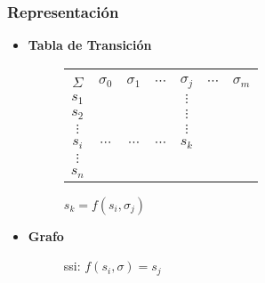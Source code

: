 \subsubsection*{Representación}
\begin{itemize}

\item \textbf{Tabla de Transición} \\

\begin{figure}[ht]
\centering
\begin{tabular}{|c|cccccc|}
    \hline
    \backslashbox{$k$}{\vspace{0.1pt}\\$\Sigma$} & $\sigma_0$ & $\sigma_1$ & $\cdots$ & $\sigma_j$ & $\cdots$ & $\sigma_m$\\ \hline
                $s_1$             &      &  &   &$\vdots$&&\\ 
                $s_2$             &      &  &  &$\vdots$&& \\ 
                $\vdots$             &      & &  & $\vdots$ &&\\ 
                $s_i$             &   $\cdots$   & $\cdots$  &$\cdots$  &$s_k$&&\\ 
                $\vdots$             &      &  &  &&& \\ 
                $s_n$             &      &  &  && &\\ \hline
\end{tabular} 
\caption{$s_k = f(s_i,\sigma_j)$}
\end{figure}
\item \textbf{Grafo} \\

\begin{figure}[ht]
\centering
{}
\caption{ssi: $f(s_i,\sigma)=s_j$}
\end{figure}
\end{itemize}
